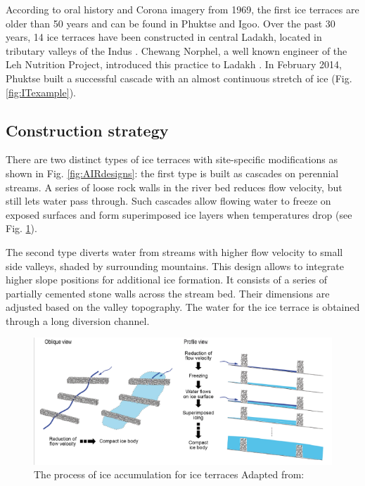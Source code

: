 According to oral history and Corona imagery from 1969, the first ice terraces are older than 50 years and can
be found in Phuktse and Igoo. Over the past 30 years, 14 ice terraces have been constructed in central Ladakh,
located in tributary valleys of the Indus \citep{norphelArtificialGlacierHigh2009,
nusserSociohydrologyArtificialGlaciers2019}. Chewang Norphel, a well known engineer of the Leh Nutrition
Project, introduced this practice to Ladakh \citep{vinceGlacierMan2009}.  In February 2014, Phuktse built a
successful cascade with an almost continuous stretch of ice (Fig. \ref{fig:ITexample}). 

\subsection{Construction strategy}

There are two distinct types of ice terraces with site-specific modifications as shown in Fig.
\ref{fig:AIRdesigns}: the first type is built as cascades on perennial streams. A series of loose rock walls in
the river bed reduces flow velocity, but still lets water pass through. Such cascades allow flowing water to
freeze on exposed surfaces and form superimposed ice layers when temperatures drop (see Fig.
\ref{fig:ITscience}). 

The second type diverts water from streams with higher flow velocity to small side valleys, shaded by
surrounding mountains. This design allows to integrate higher slope positions for additional ice formation. It
consists of a series of partially cemented stone walls across the stream bed. Their dimensions are adjusted
based on the valley topography. The water for the ice terrace is obtained through a long diversion channel. 

\begin{figure}[htb]
\centering
\includegraphics[width=12cm]{figs/IT_science.png}

\caption{ The process of ice accumulation for ice terraces Adapted from:
\cite{nusserSociohydrologyArtificialGlaciers2019}}

\label{fig:ITscience}
\end{figure}

